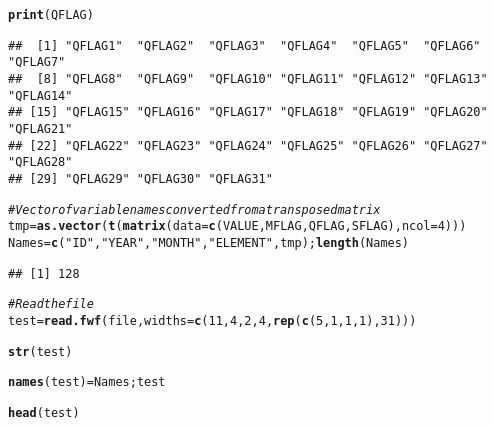 \documentclass{article}\usepackage[]{graphicx}\usepackage[]{color}
\makeatletter
\newcommand{\hlnum}[1]{\textcolor[rgb]{0.686,0.059,0.569}{#1}}%
\newcommand{\hlstr}[1]{\textcolor[rgb]{0.192,0.494,0.8}{#1}}%
\newcommand{\hlcom}[1]{\textcolor[rgb]{0.678,0.584,0.686}{\textit{#1}}}%
\newcommand{\hlstd}[1]{\textcolor[rgb]{0.345,0.345,0.345}{#1}}%
\newcommand{\hlkwb}[1]{\textcolor[rgb]{0.69,0.353,0.396}{#1}}%
\newcommand{\hlkwc}[1]{\textcolor[rgb]{0.333,0.667,0.333}{#1}}%
\newcommand{\hlkwd}[1]{\textcolor[rgb]{0.737,0.353,0.396}{\textbf{#1}}}%
\newenvironment{kframe}{%
 \def\at@end@of@kframe{}%
 \ifinner\ifhmode%
  \def\at@end@of@kframe{\end{minipage}}%
  \begin{minipage}{\columnwidth}%
 \fi\fi%
 \def\FrameCommand##1{\hskip\@totalleftmargin \hskip-\fboxsep
 \colorbox{shadecolor}{##1}\hskip-\fboxsep
     \hskip-\linewidth \hskip-\@totalleftmargin \hskip\columnwidth}%
 \MakeFramed {\advance\hsize-\width
   \@totalleftmargin\z@ \linewidth\hsize
   \@setminipage}}%
 {\par\unskip\endMakeFramed%
 \at@end@of@kframe}
\newenvironment{knitrout}{}{} %
\makeatother
\begin{document}
\begin{knitrout}
\begin{kframe}
\begin{alltt}
\hlkwd{print}\hlstd{(QFLAG)}
\end{alltt}
\begin{verbatim}
##  [1] "QFLAG1"  "QFLAG2"  "QFLAG3"  "QFLAG4"  "QFLAG5"  "QFLAG6"  "QFLAG7" 
##  [8] "QFLAG8"  "QFLAG9"  "QFLAG10" "QFLAG11" "QFLAG12" "QFLAG13" "QFLAG14"
## [15] "QFLAG15" "QFLAG16" "QFLAG17" "QFLAG18" "QFLAG19" "QFLAG20" "QFLAG21"
## [22] "QFLAG22" "QFLAG23" "QFLAG24" "QFLAG25" "QFLAG26" "QFLAG27" "QFLAG28"
## [29] "QFLAG29" "QFLAG30" "QFLAG31"
\end{verbatim}
\begin{alltt}
\hlcom{# Vector of variable names converted from a transposed matrix}
\hlstd{tmp} \hlkwb{=} \hlkwd{as.vector}\hlstd{(}\hlkwd{t}\hlstd{(}\hlkwd{matrix}\hlstd{(}\hlkwc{data}\hlstd{=}\hlkwd{c}\hlstd{(VALUE, MFLAG, QFLAG, SFLAG),} \hlkwc{ncol}\hlstd{=}\hlnum{4}\hlstd{)))}
\hlstd{Names} \hlkwb{=} \hlkwd{c}\hlstd{(}\hlstr{"ID"}\hlstd{,} \hlstr{"YEAR"}\hlstd{,} \hlstr{"MONTH"}\hlstd{,} \hlstr{"ELEMENT"}\hlstd{, tmp);} \hlkwd{length}\hlstd{(Names)}
\end{alltt}
\begin{verbatim}
## [1] 128
\end{verbatim}
\begin{alltt}
\hlcom{# Read the file}
\hlstd{test} \hlkwb{=} \hlkwd{read.fwf}\hlstd{(file,}\hlkwc{widths} \hlstd{=} \hlkwd{c}\hlstd{(}\hlnum{11}\hlstd{,} \hlnum{4}\hlstd{,} \hlnum{2}\hlstd{,} \hlnum{4}\hlstd{,} \hlkwd{rep}\hlstd{(}\hlkwd{c}\hlstd{(}\hlnum{5}\hlstd{,} \hlnum{1}\hlstd{,} \hlnum{1}\hlstd{,} \hlnum{1}\hlstd{),}\hlnum{31}\hlstd{)))}
\end{alltt}


{\ttfamily\noindent{}}

{\ttfamily\noindent\bfseries{}}\begin{alltt}
\hlkwd{str}\hlstd{(test)}
\end{alltt}


{\ttfamily\noindent\bfseries\color{errorcolor}{\#\# Error in str(test): object 'test' not found}}\begin{alltt}
\hlkwd{names}\hlstd{(test)}\hlkwb{=} \hlstd{Names; test}
\end{alltt}


{\ttfamily\noindent\bfseries\color{errorcolor}{\#\# Error in names(test) = Names: object 'test' not found}}

{\ttfamily\noindent\bfseries\color{errorcolor}{\#\# Error in eval(expr, envir, enclos): object 'test' not found}}\begin{alltt}
\hlkwd{head}\hlstd{(test)}
\end{alltt}


{\ttfamily\noindent\bfseries\color{errorcolor}{\#\# Error in head(test): object 'test' not found}}\end{kframe}
\end{knitrout}
\end{document}
